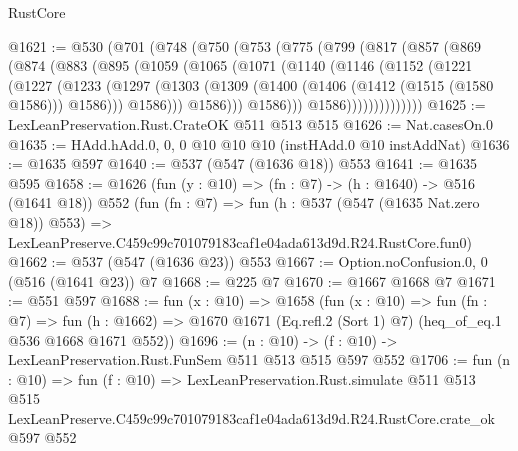 \begin{lexlean}{RustCore}
\begin{coremodule}
@1621 := @530
    (@701
      (@748
        (@750
          (@753
            (@775
              (@799
                (@817
                  (@857
                    (@869
                      (@874
                        (@883
                          (@895
                            (@1059
                              (@1065
                                (@1071
                                  (@1140
                                    (@1146
                                      (@1152
                                        (@1221
                                          (@1227
                                            (@1233
                                              (@1297
                                                (@1303
                                                  (@1309
                                                    (@1400
                                                      (@1406 (@1412 (@1515 (@1580 @1586))) @1586)))
                                                  @1586)))
                                            @1586)))
                                      @1586)))
                                @1586))))))))))))))
@1625 := LexLeanPreservation.Rust.CrateOK @511 @513 @515
@1626 := Nat.casesOn.{0}
@1635 := HAdd.hAdd.{0, 0, 0} @10 @10 @10 (instHAdd.{0} @10 instAddNat)
@1636 := @1635 @597
@1640 := @537 (@547 (@1636 @18)) @553
@1641 := @1635 @595
@1658 := @1626
    (fun (y : @10) => (fn : @7) -> (h : @1640) -> @516 (@1641 @18))
    @552
    (fun (fn : @7) =>
    fun (h : @537 (@547 (@1635 Nat.zero @18)) @553) =>
    LexLeanPreserve.C459c99c701079183caf1e04ada613d9d.R24.RustCore.fun0)
@1662 := @537 (@547 (@1636 @23)) @553
@1667 := Option.noConfusion.{0, 0} (@516 (@1641 @23)) @7
@1668 := @225 @7
@1670 := @1667 @1668 @7
@1671 := @551 @597
@1688 := fun (x : @10) =>
  @1658
    (fun (x : @10) =>
    fun (fn : @7) =>
    fun (h : @1662) => @1670 @1671 (Eq.refl.{2} (Sort 1) @7) (heq_of_eq.{1} @536 @1668 @1671 @552))
@1696 := (n : @10) -> (f : @10) -> LexLeanPreservation.Rust.FunSem @511 @513 @515 @597 @552
@1706 := fun (n : @10) =>
  fun (f : @10) =>
  LexLeanPreservation.Rust.simulate
    @511
    @513
    @515
    LexLeanPreserve.C459c99c701079183caf1e04ada613d9d.R24.RustCore.crate_ok
    @597
    @552
\end{coremodule}
\end{lexlean}
